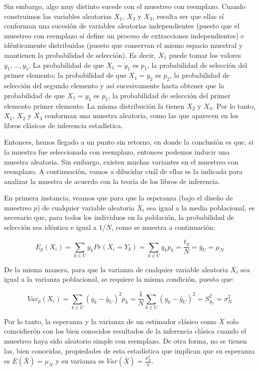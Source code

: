 \documentclass[
  12pt,
]{book}
\begin{document}
Sin embargo, algo muy distinto sucede con el muestreo con reemplazo. Cuando construimos las variables aleatorias \(X_1\), \(X_2\) y \(X_3\), resulta ser que ellas sí conforman una sucesión de variables aleatorias independientes (puesto que el muestreo con reemplazo sí define un proceso de extracciones independientes) e idénticamente distribuidas (puesto que conservan el mismo espacio muestral y mantienen la probabilidad de selección). Es decir, \(X_1\) puede tomar los valores \(y_1, \ldots, y_5\). La probabilidad de que \(X_1=y_1\) es \(p_1\), la probabilidad de selección del primer elemento; la probabilidad de que \(X_1=y_2\) es \(p_2\), la probabilidad de selección del segundo elemento y así sucesivamente hasta obtener que la probabilidad de que \(X_1=y_5\) es \(p_5\), la probabilidad de selección del primer elemento primer elemento. La misma distribución la tienen \(X_2\) y \(X_3\). Por lo tanto, \(X_1\), \(X_2\) y \(X_3\) conforman una muestra aleatoria, como las que aparecen en los libros clásicos de inferencia estadística.

Entonces, hemos llegado a un punto sin retorno, en donde la conclusión es que, si la muestra fue seleccionada con reemplazo, entonces podemos inducir una muestra aleatoria. Sin embargo, existen muchas variantes en el muestreo con reemplazo. A continuación, vamos a dilucidar cuál de ellas es la indicada para analizar la muestra de acuerdo con la teoría de los libros de inferencia.

En primera instancia, veamos que para que la esperanza (bajo el diseño de muestreo \(p\)) de cualquier variable aleatoria \(X_i\) sea igual a la media poblacional, es necesario que, para todos los individuos en la población, la probabilidad de selección sea idéntica e igual a \(1/N\), como se muestra a continuación:

\[
E_p(X_i)=\sum_{k \in U} y_k Pr(X_i = Y_k) = \sum_{k \in U} y_k p_k 
= \frac{t_y}{N} = \bar{y}_U=\mu_N
\]

De la misma manera, para que la varianza de cualquier variable aleatoria \(X_i\) sea igual a la varianza poblacional, se requiere la misma condición, puesto que:

\[
Var_p(X_i)
= \sum_{k \in U} (y_k - \bar{y}_U)^2 p_k 
= \frac{1}{N}\sum_{k \in U} (y_k - \bar{y}_U)^2  = S^2_{y_U} = \sigma^2_N
\]

Por lo tanto, la esperanza y la varianza de un estimador clásico como \(\bar{X}\) solo coincidierón con los bien conocidos resultados de la inferencia clásica cuando el muestreo haya sido aleatorio simple con reemplazo. De otra forma, no se tienen las, bien conocidas, propiedades de esta estadística que implican que su esperanza es \(E(\bar{X}) = \mu_N\) y su varianza es \(Var(\bar{X}) = \frac{\sigma^2_N}{n}\).
\end{document}
